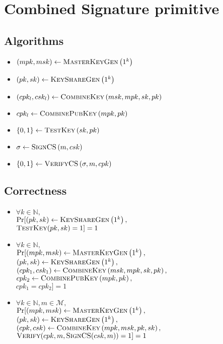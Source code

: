\section{Combined Signature primitive}
  \label{appendix:combinedsign}
  \subsection{Algorithms}
    \begin{itemize}
      \item $\left(mpk, msk\right) \gets \textsc{MasterKeyGen}\left(1^k\right)$
      \item $\left(pk, sk\right) \gets \textsc{KeyShareGen}\left(1^k\right)$
      \item $\left(cpk_l, csk_l\right) \gets \textsc{CombineKey}\left(msk,
      mpk, sk, pk\right)$
      \item $cpk_l \gets \textsc{CombinePubKey}\left(mpk, pk\right)$
      \item $\{0, 1\} \gets \textsc{TestKey}\left(sk, pk\right)$
      \item $\sigma \gets \textsc{SignCS}\left(m, csk\right)$
      \item $\left\{0, 1\right\} \gets \textsc{VerifyCS}\left(\sigma, m,
      cpk\right)$
    \end{itemize}

  \subsection{Correctness}
    \begin{itemize}
      \item $\forall k \in \mathbb{N},$ \\
      $\Pr[\left(pk, sk\right) \gets \textsc{KeyShareGen}\left(1^k\right),$ \\
      $\textsc{TestKey}(pk, sk) = 1] = 1$

      \item $\forall k \in \mathbb{N},$ \\
      $\Pr[(mpk, msk) \gets \textsc{MasterKeyGen}\left(1^k\right),$ \\
      $\left(pk, sk\right) \gets \textsc{KeyShareGen}\left(1^k\right),$ \\
      $\left(cpk_1, csk_1\right) \gets \textsc{CombineKey}\left(msk, mpk, sk,
      pk\right),$ \\
      $cpk_2 \gets \textsc{CombinePubKey}\left(mpk, pk\right),$ \\
      $cpk_1 = cpk_2] = 1$

      \item $\forall k \in \mathbb{N}, m \in \mathcal{M},$ \\
      $\Pr[(mpk, msk) \gets \textsc{MasterKeyGen}\left(1^k\right),$ \\
      $\left(pk, sk\right) \gets \textsc{KeyShareGen}\left(1^k\right),$ \\
      $\left(cpk, csk\right) \gets \textsc{CombineKey}\left(mpk, msk, pk,
      sk\right),$ \\
      $\textsc{Verify}(cpk, m, \textsc{SignCS}(csk, m)) = 1] = 1$
    \end{itemize}

